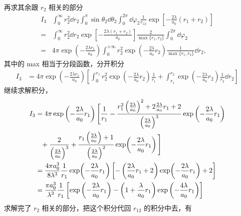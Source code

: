 再求其余跟 $r_2$ 相关的部分
\begin{align}
    I_3{}& \int_0^\infty r_2^2 \dd r_2 \int_0^\pi \sin\theta_2 \dd\theta_2 \int_0^{2\pi}\dd\varphi_2 \frac1{r_{12}}
    \exp\left[-\frac{2\lambda}{a_0}(r_1 + r_2)\right] 
    \\
    ={}& \int_0^\infty r_2^2 \dd r_2 \exp\left[
        -\frac{2\lambda(r_1 + r_2)}{a_0}
    \right] \frac{2}{\max\{r_1, r_2\}} 
    \int_0^{2\pi} \dd\varphi_2 \\
    ={}& 4\pi \exp\left(-\frac{2\lambda r_1}{a_0}\right) 
    \int_0^{+\infty} r_2^2 \exp\!\left(-\frac{2\lambda}{a_0}r_2\right) \frac1{\max\{r_1, r_2\}} \dd r_2, 
\end{align}
其中的 max 相当于分段函数，分开积分
\begin{align}
    I_3 &= 4\pi \exp\left(
        -\frac{2\lambda r_1}{a_0}\right)
        \left[
            \int_0^{r_1} r_2^2 \exp\left(- \frac{2\lambda}{a_0}r_2\right) \frac1{r_1} + \int_{r_1}^{r_2} \exp\!\left(-\frac{2\lambda}{a_0}r_2\right) \frac1{r_2} \dd r_2
        \right]
\end{align}
继续求解积分，
\begin{align}
    I_3 &= 4\pi \exp\left(- \frac{2\lambda}{a_0}r_1\right) 
    \Bigg[
        \frac 1{r_1} - \frac{r_1^2 \left(\frac{2\lambda}{a_0}\right)^2 + 2 \frac{2\lambda}{a_0} r_1 + 2}{\left(\frac{2\lambda}{a_0}\right)^3} \exp\left(-\frac{2\lambda}{a_0}r_1\right) \notag\\
    &\phantom{=} + \frac{2}{\left(\frac{2\lambda}{a_0}\right)^3} + \frac{r_1 \left(\frac{2\lambda}{a_0}\right) + 1}{\left(\frac{2\lambda}{a_0}\right)^2} \exp\!\left(-\frac{2\lambda}{a_0}r_1\right)\Bigg]\\
    &=\frac{4\pi a_0^3}{8\lambda^3} \frac1{r_1} \exp\!\left(-\frac{2\lambda}{a_0}r_1\right) 
    \left[
        -\left(\frac{2\lambda}{a_0}r_1 + 2\right) \exp\!\left(-\frac{2\lambda}{a_0}r_1\right) + 2
    \right] \\
    &=\frac{\pi a_0^3}{\lambda^3} \frac1{r_1} \left[
        \exp\left(-\frac{2\lambda}{a_0}r_1\right) - \left(1+\frac{\lambda}{a_0}r_1\right) \exp\left(-\frac{4\lambda}{a_0}r_1\right)
    \right]
\end{align}
求解完了 $r_2$ 相关的部分，把这个积分代回 $r_{12}$ 的积分中去，有

